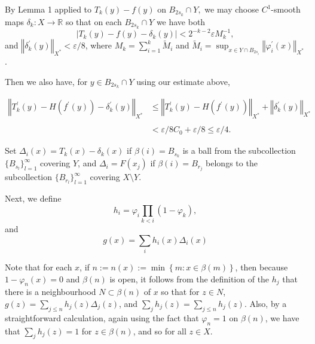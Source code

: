 \documentclass[11pt]{amsproc}%
\theoremstyle{plain}
\numberwithin{equation}{section}
\begin{document}
\medskip

\noindent By Lemma 1 applied to $T_{k}(y)-f(y)$ on $B_{2s_{k}}\cap Y,$ we may
choose $C^{1}$-smooth maps $\delta_{k}:X\rightarrow\mathbb{R}$ so that on each
$B_{2s_{k}}\cap Y$ we have both
\[
\left\vert T_{k}\left(  y\right)  -f\left(  y\right)  -\delta_{k}\left(
y\right)  \right\vert <2^{-k-2}\varepsilon M_{k}^{-1},
\]
and $\left\Vert \delta_{k}^{\prime}\left(  y\right)  \right\Vert _{X^{\ast}%
}<\varepsilon/8$, where $M_{k}=\sum_{i=1}^{k}\widetilde{M}_{i}$ and
$\widetilde{M}_{i}=\sup_{x\in Y\cap B_{2s_{i}}}\left\Vert \varphi_{i}^{\prime
}\left(  x\right)  \right\Vert _{X^{\ast}}$.

\medskip

\noindent Then we also have, for $y\in B_{2s_{k}}\cap Y$ using our estimate above,

\medskip%

\begin{align*}
\left\Vert T_{k}^{\prime}\left(  y\right)  -H(f^{\prime}\left(  y\right)
)-\delta_{k}^{\prime}\left(  y\right)  \right\Vert _{X^{\ast}}  &
\leq\left\Vert T_{k}^{\prime}\left(  y\right)  -H\left(  f^{\prime}\left(
y\right)  \right)  \right\Vert _{X^{\ast}}+\left\Vert \delta_{k}^{\prime
}\left(  y\right)  \right\Vert _{X^{\ast}}\\
& \\
&  <\varepsilon/8C_{0}+\varepsilon/8\leq\varepsilon/4.
\end{align*}


\medskip

Set $\Delta_{i}\left(  x\right)  =T_{k}\left(  x\right)  -\delta_{k}\left(
x\right)  $ if $\beta(i)=B_{s_{k}}$ is a ball from the subcollection
$\{B_{s_{l}}\}_{l=1}^{\infty}$ covering $Y$, and $\Delta_{i}=F\left(
x_{j}\right)  $ if $\beta(i)=B_{r_{j}}$ belongs to the subcollection
$\{B_{r_{l}}\}_{l=1}^{\infty}$ covering $X\setminus Y$.

\medskip

\noindent Next, we define
\[
h_{i}=\varphi_{i}\prod_{k<i}\left(  1-\varphi_{k}\right)  ,
\]
and
\[
g\left(  x\right)  =\sum_{i}h_{i}\left(  x\right)  \Delta_{i}\left(  x\right)
\]


Note that for each $x$, if $n:=n\left(  x\right)  :=\min\left\{  m:x\in
\beta(m)\right\}  $, then because $1-\varphi_{n}\left(  x\right)  =0$ and
$\beta(n)$ is open, it follows from the definition of the $h_{j}$ that there
is a neighbourhood $N\subset\beta(n)$ of $x$ so that for $z\in N$, $g\left(
z\right)  =\sum_{j\leq n}h_{j}\left(  z\right)  \Delta_{j}\left(  z\right)  $,
and $\sum_{j}h_{j}(z)=\sum_{j\leq n}h_{j}(z)$. Also, by a straightforward
calculation, again using the fact that $\varphi_{n}=1$ on $\beta(n)$, we have
that $\sum_{j}h_{j}\left(  z\right)  =1$ for $z\in\beta(n)$, and so for all
$z\in X.$
\end{document}
